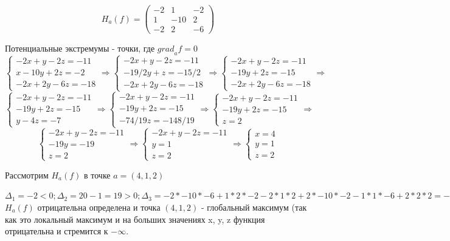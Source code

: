 \documentclass[a4paper,12pt]{article}
\newcounter{z}
\begin{document}
\begin{enumerate}
\begin{enumerate}
$$H_a(f) = \begin{pmatrix}
-2  &  1 &-2  \\
1  &  -10 &2  \\
 -2 & 2 &-6 
\end{pmatrix}$$

Потенциальные экстремумы - точки, где ${grad}_af = 0$
$$\begin{cases} -2x+y-2z=-11 \\ x-10y+2z=-2\\ -2x+2y-6z=-18\end{cases} \Rightarrow \begin{cases} -2x+y-2z=-11 \\ -19/2y+z=-15/2\\ -2x+2y-6z=-18\end{cases} \Rightarrow\begin{cases} -2x+y-2z=-11 \\ -19y+2z=-15\\ -2x+2y-6z=-18\end{cases} \Rightarrow$$
$$\begin{cases} -2x+y-2z=-11 \\ -19y+2z=-15\\ y-4z=-7\end{cases} \Rightarrow \begin{cases} -2x+y-2z=-11 \\ -19y+2z=-15\\ -74/19z=-148/19\end{cases} \Rightarrow\begin{cases} -2x+y-2z=-11 \\ -19y+2z=-15\\ z=2\end{cases} \Rightarrow$$
$$\begin{cases} -2x+y-2z=-11 \\ -19y=-19\\ z=2\end{cases} \Rightarrow\begin{cases} -2x+y-2z=-11 \\ y=1\\ z=2\end{cases} \Rightarrow\begin{cases} x=4 \\ y=1\\ z=2\end{cases}$$

Рассмотрим $H_a(f)$ в точке $a=(4,1,2)$

$\Delta_1 = -2 < 0; \Delta_2 = 20-1 = 19>0 ;\Delta_3 = -2*-10*-6+1*2*-2-2*1*2+2*-10*-2-1*1*-6+2*2*2=-74<0\Rightarrow$ $H_a(f)$ отрицательна определена и точка $(4,1,2)$ - глобальный максимум (так как это локальный максимум и на больших значениях x, y, z функция отрицательна и стремится к $-\infty$.
\end{enumerate}
\end{enumerate}
\end{document}
